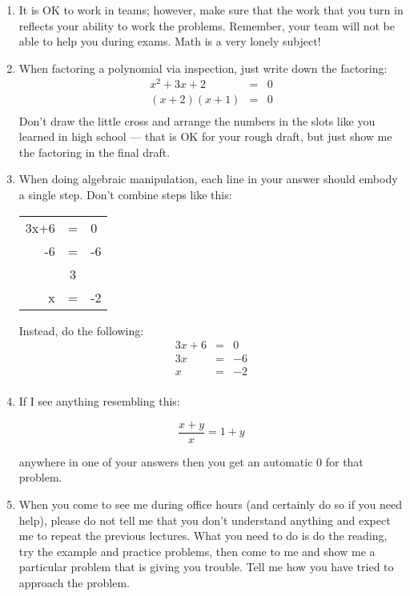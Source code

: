 \documentclass[letterpaper,12pt,fleqn]{article}
\begin{document}
\begin{enumerate}
\item It is OK to work in teams; however, make sure that the work that you turn
    in reflects your ability to work the problems. Remember, your team will not
    be able to help you during exams. Math is a very lonely subject!

\item When factoring a polynomial via inspection, just write down the factoring:
\begin{eqnarray*}
x^2+3x+2 &=& 0 \\
(x+2)(x+1) &=& 0 \\
\end{eqnarray*}
Don't draw the little cross and arrange the numbers in the slots like you
learned in high school --- that is OK for your rough draft, but just show me
the factoring in the final draft.

\item When doing algebraic manipulation, each line in your answer should
    embody a single step. Don't combine steps like this:

\begin{tabular}{rcl}
3x+6 & = & 0 \\
-6 & = & -6 \\
\hline
 & 3 & \\
x & = & -2 \\
\end{tabular}

Instead, do the following:
\begin{eqnarray*}
3x+6 &=& 0 \\
3x &=& -6 \\
x &=& -2 \\
\end{eqnarray*}

\item If I see anything resembling this:

\[\frac{x+y}{x} = 1+y\]

anywhere in one of your answers then you get an automatic 0 for that problem.

\item When you come to see me during office hours (and certainly do so if you
    need help), please do not tell me that you don't understand anything and
    expect me to repeat the previous lectures. What you need to do is do the
    reading, try the example and practice problems, then come to me and show me
    a particular problem that is giving you trouble. Tell me how you have tried
    to approach the problem.

\end{enumerate}
\end{document}
